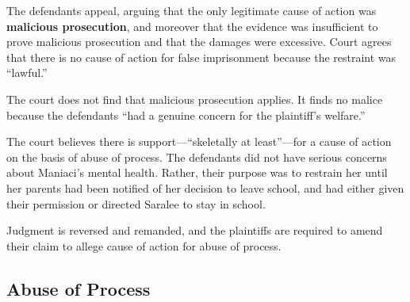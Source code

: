 \begin{enumerate}
The defendants appeal, arguing that the only legitimate cause of action was \textbf{malicious prosecution}, and moreover that the evidence was insufficient to prove malicious prosecution and that the damages were excessive. Court agrees that there is no cause of action for false imprisonment because the restraint was ``lawful.''

The court does not find that malicious prosecution applies. It finds no malice because the defendants ``had a genuine concern for the plaintiff's welfare.''

The court believes there is support---``skeletally at least''---for a cause of action on the basis of abuse of process. The defendants did not have serious concerns about Maniaci's mental health. Rather, their purpose was to restrain her until her parents had been notified of her decision to leave school, and had either given their permission or directed Saralee to stay in school.

Judgment is reversed and remanded, and the plaintiffs are required to amend their claim to allege cause of action for abuse of process.
\end{enumerate}

\subsection{Abuse of Process}

